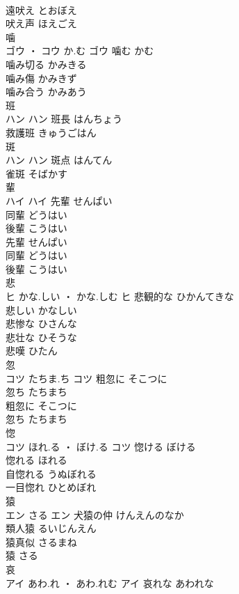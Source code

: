 \documentclass[8pt]{extreport}
\begin{document}
\begin{CJK}{UTF8}{min}
\\	遠吠え	とおぼえ	
\\	吠え声	ほえごえ	
\\	噛	
\\	ゴウ ・ コウ	か.む	ゴウ	噛む	かむ	
\\	噛み切る	かみきる	
\\	噛み傷	かみきず	
\\	噛み合う	かみあう	
\\	班	
\\	ハン		ハン	班長	はんちょう	
\\	救護班	きゅうごはん	
\\	斑	
\\	ハン		ハン	斑点	はんてん	
\\	雀斑	そばかす	
\\	輩	
\\	ハイ		ハイ	先輩	せんぱい	
\\	同輩	どうはい	
\\	後輩	こうはい	
\\	先輩	せんぱい	
\\	同輩	どうはい	
\\	後輩	こうはい	
\\	悲	
\\	ヒ	かな.しい ・ かな.しむ	ヒ	悲観的な	ひかんてきな	
\\	悲しい	かなしい	
\\	悲惨な	ひさんな	
\\	悲壮な	ひそうな	
\\	悲嘆	ひたん	
\\	忽	
\\	コツ	たちま.ち	コツ	粗忽に	そこつに	
\\	忽ち	たちまち	
\\	粗忽に	そこつに	
\\	忽ち	たちまち	
\\	惚	
\\	コツ	ほれ.る ・ ぼけ.る	コツ	惚ける	ぼける	
\\	惚れる	ほれる	
\\	自惚れる	うぬぼれる	
\\	一目惚れ	ひとめぼれ	
\\	猿	
\\	エン	さる	エン	犬猿の仲	けんえんのなか	
\\	類人猿	るいじんえん	
\\	猿真似	さるまね	
\\	猿	さる	
\\	哀	
\\	アイ	あわ.れ ・ あわ.れむ	アイ	哀れな	あわれな	

\end{CJK}
\end{document}
